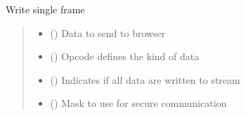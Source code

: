 \documentclass[letterpaper,10pt,english]{sphinxmanual}
\begin{document}
\begin{savenotes}
\begin{fulllineitems}
\begin{savenotes}
\begin{fulllineitems}
\end{fulllineitems}\end{savenotes}


\begin{savenotes}\begin{fulllineitems}
\label{\detokenize{eezz:eezz.websocket.TWebSocketClient.write_frame}}
\pysigstartsignatures
{}
\pysigstopsignatures
\sphinxAtStartPar
Write single frame
\begin{quote}\begin{description}
\begin{itemize}
\item {} 
\sphinxAtStartPar
{} () \textendash{} Data to send to browser

\item {} 
\sphinxAtStartPar
{} () \textendash{} Opcode defines the kind of data

\item {} 
\sphinxAtStartPar
{} () \textendash{} Indicates if all data are written to stream

\item {} 
\sphinxAtStartPar
{} (\sphinxstyleliteralemphasis{\sphinxupquote{{[}}}\sphinxstyleliteralemphasis{\sphinxupquote{,}}\sphinxstyleliteralemphasis{\sphinxupquote{,}}\sphinxstyleliteralemphasis{\sphinxupquote{,}}\sphinxstyleliteralemphasis{\sphinxupquote{{]}}}) \textendash{} Mask to use for secure communication


\end{itemize}
\end{description}
\end{quote}
\end{fulllineitems}
\end{savenotes}
\end{fulllineitems}
\end{savenotes}
\end{document}
